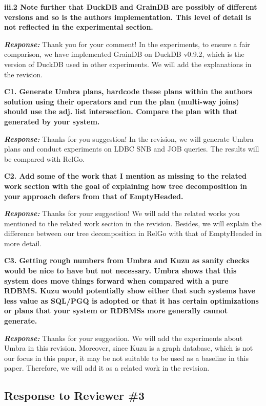 \textbf{
iii.2 Note further that DuckDB and GrainDB are possibly of different versions and so is the authors implementation. This level of detail is not reflected in the experimental section.}

\textbf{\textit{Response: }}
Thank you for your comment! In the experiments, to ensure a fair comparison, we have implemented GrainDB on DuckDB v0.9.2, which is the version of DuckDB used in other experiments. We will add the explanations in the revision.


\textbf{
C1. Generate Umbra plans, hardcode these plans within the authors solution using their operators and run the plan (multi-way joins) should use the adj. list intersection. Compare the plan with that generated by your system. }

\textbf{\textit{Response: }}
Thanks for you suggestion! In the revision, we will generate Umbra plans and conduct experiments on LDBC SNB and JOB queries. The results will be compared with RelGo.

\textbf{
C2. Add some of the work that I mention as missing to the related work section with the goal of explaining how tree decomposition in your approach defers from that of EmptyHeaded. }

\textbf{\textit{Response: }} Thanks for your suggestion! We will add the related works you mentioned to the related work section in the revision. Besides, we will explain the difference between our tree decomposition in RelGo with that of EmptyHeaded in more detail.


\textbf{
C3. Getting rough numbers from Umbra and Kuzu as sanity checks would be nice to have but not necessary. Umbra shows that this system does move things forward when compared with a pure RDBMS. Kuzu would potentially show either that such systems have less value as SQL/PGQ is adopted or that it has certain optimizations or plans that your system or RDBMSs more generally cannot generate. }

\textbf{\textit{Response: }}
Thanks for your suggestion. We will add the experiments about Umbra in this revision. Moreover, since Kuzu is a graph database, which is not our focus in this paper, it may be not suitable to be used as a baseline in this paper. Therefore, we will add it as a related work in the revision.


\subsection{Response to Reviewer \#3}

